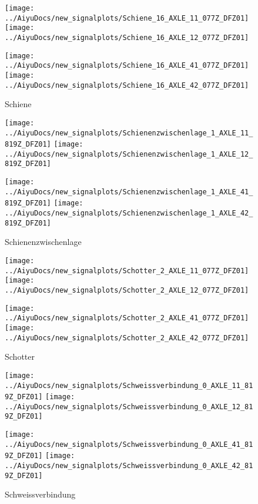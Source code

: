 \begin{figure}[H]
	\centering
	\texttt{[image: ../AiyuDocs/new\_signalplots/Schiene\_16\_AXLE\_11\_077Z\_DFZ01]}
	\texttt{[image: ../AiyuDocs/new\_signalplots/Schiene\_16\_AXLE\_12\_077Z\_DFZ01]}
	
	\texttt{[image: ../AiyuDocs/new\_signalplots/Schiene\_16\_AXLE\_41\_077Z\_DFZ01]}
	\texttt{[image: ../AiyuDocs/new\_signalplots/Schiene\_16\_AXLE\_42\_077Z\_DFZ01]}
	\caption{Schiene}
\end{figure}

\begin{figure}[H]
	\centering
	\texttt{[image: ../AiyuDocs/new\_signalplots/Schienenzwischenlage\_1\_AXLE\_11\_819Z\_DFZ01]}
	\texttt{[image: ../AiyuDocs/new\_signalplots/Schienenzwischenlage\_1\_AXLE\_12\_819Z\_DFZ01]}
	
	\texttt{[image: ../AiyuDocs/new\_signalplots/Schienenzwischenlage\_1\_AXLE\_41\_819Z\_DFZ01]}
	\texttt{[image: ../AiyuDocs/new\_signalplots/Schienenzwischenlage\_1\_AXLE\_42\_819Z\_DFZ01]}
	\caption{Schienenzwischenlage}
\end{figure}

\begin{figure}[H]
	\centering
	\texttt{[image: ../AiyuDocs/new\_signalplots/Schotter\_2\_AXLE\_11\_077Z\_DFZ01]}
	\texttt{[image: ../AiyuDocs/new\_signalplots/Schotter\_2\_AXLE\_12\_077Z\_DFZ01]}
	
	\texttt{[image: ../AiyuDocs/new\_signalplots/Schotter\_2\_AXLE\_41\_077Z\_DFZ01]}
	\texttt{[image: ../AiyuDocs/new\_signalplots/Schotter\_2\_AXLE\_42\_077Z\_DFZ01]}
	\caption{Schotter}
\end{figure}

\begin{figure}[H]
	\centering
	\texttt{[image: ../AiyuDocs/new\_signalplots/Schweissverbindung\_0\_AXLE\_11\_819Z\_DFZ01]}
	\texttt{[image: ../AiyuDocs/new\_signalplots/Schweissverbindung\_0\_AXLE\_12\_819Z\_DFZ01]}
	
	\texttt{[image: ../AiyuDocs/new\_signalplots/Schweissverbindung\_0\_AXLE\_41\_819Z\_DFZ01]}
	\texttt{[image: ../AiyuDocs/new\_signalplots/Schweissverbindung\_0\_AXLE\_42\_819Z\_DFZ01]}
	\caption{Schweissverbindung}
\end{figure}


